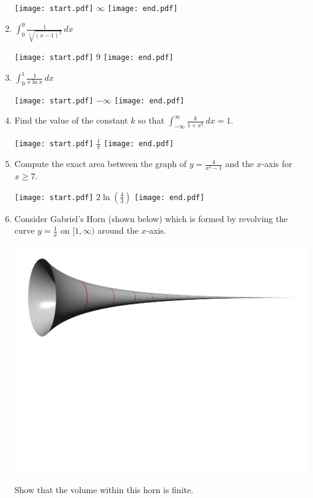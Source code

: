 \documentclass[12pt]{article}
\begin{document}
\begin{enumerate}
\texttt{[image: start.pdf]}
{{$\infty$}}
\texttt{[image: end.pdf]}


\item $\int_0^9 \frac{1}{\sqrt[3]{(x-1)^2}} \,dx$

\texttt{[image: start.pdf]}
{{9}}
\texttt{[image: end.pdf]}


\item $\int_{0}^{1}\frac{1}{x\ln{x}}\,dx$ 

\texttt{[image: start.pdf]}
{{$-\infty$}}
\texttt{[image: end.pdf]}


\item Find the value of the constant $k$ so that $\int_{-\infty}^{\infty} \frac{k}{1+x^2} \,dx=1$.

\texttt{[image: start.pdf]}
{{$\frac{1}{\pi}$}}
\texttt{[image: end.pdf]}


\item Compute the exact area between the graph of $y=\frac{4}{x^2-1}$ and the $x$-axis for $x \geq 7$.

\texttt{[image: start.pdf]}
{{$2\ln{\left(\frac{4}{3}\right)}$}}
\texttt{[image: end.pdf]}


\item Consider Gabriel's Horn (shown below) which is formed by revolving the curve $y=\frac{1}{x}$ on $[1,\infty)$ around the $x$-axis.

\begin{center}
\includegraphics[scale=0.5]{GabrielHorn.pdf}
\end{center}

Show that the volume within this horn is finite.


\end{enumerate}
\end{document}
